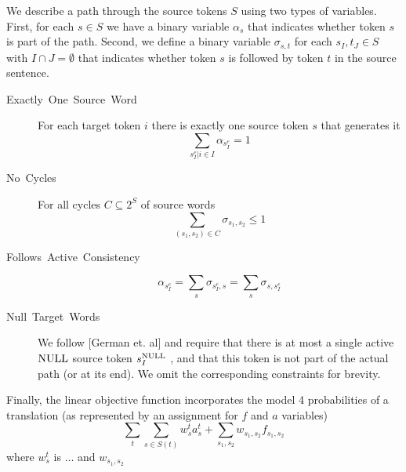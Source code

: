 We describe a path through the source tokens $S$ using two types
of variables. First, for each $s\in S$ we have a binary variable
$\alpha_{s}$ that indicates whether token $s$ is part of the path.
Second, we define a binary variable $\sigma_{s,t}$ for each $s_{I},t_{J}\in S$
with $I\cap J=\emptyset$ that indicates whether token $s$ is followed
by token $t$ in the source sentence. 
\begin{description}
\item [{Exactly~One~Source~Word}] For each target token $i$ there is
exactly one source token $s$ that generates it \[
\sum_{s_{I}^{e}|i\in I}\alpha_{s_{I}^{e}}=1\]

\item [{No~Cycles}] For all cycles $C\subseteq2^{S}$ of source words
\[
\sum_{\left(s_{1},s_{2}\right)\in C}\sigma_{s_{1},s_{2}}\leq1\]

\item [{Follows~Active~Consistency}] \[
\alpha_{s_{I}^{e}}=\sum_{s}\sigma_{s_{I}^{e},s}=\sum_{s}\sigma_{s,s_{I}^{e}}\]

\item [{Null~Target~Words}] We follow {[}German et. al{]} and require
that there is at most a single active$\text{NULL}$ source token $s_{I}^{\text{NULL}}$
, and that this token is not part of the actual path (or at its end).
We omit the corresponding constraints for brevity.
\end{description}
Finally, the linear objective function incorporates the model 4 probabilities
of a translation (as represented by an assignment for $f$ and $a$
variables) \[
\sum_{t}\sum_{s\in S\left(t\right)}w_{s}^{t}a_{s}^{t}+\sum_{s_{1},s_{2}}w_{s_{1},s_{2}}f_{s_{1},s_{2}}\]
 where $w_{s}^{t}$ is $\ldots$ and $w_{s_{1},s_{2}}$
